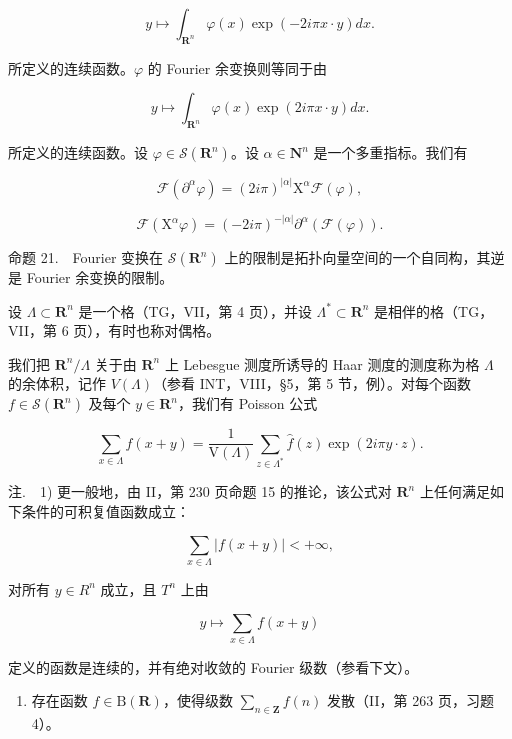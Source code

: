 \[
y \mapsto \int_ {\mathbf {R} ^ {n}} \varphi (x) \exp (- 2 i \pi x \cdot y) d x.
\]

所定义的连续函数。\(\varphi\) 的 Fourier 余变换则等同于由

\[
y \mapsto \int_ {\mathbf {R} ^ {n}} \varphi (x) \exp (2 i \pi x \cdot y) d x.
\]

所定义的连续函数。设 \(\varphi\in\mathcal{S}(\mathbf{R}^{n})\)。设 \(\alpha\in\mathbf{N}^{n}\) 是一个多重指标。我们有

\[
\mathcal {F} (\partial^ {\alpha} \varphi) = (2 i \pi) ^ {| \alpha |} \mathrm{X} ^ {\alpha} \mathcal {F} (\varphi),
\]

\[
\mathcal {F} (\mathrm{X} ^ {\alpha} \varphi) = (- 2 i \pi) ^ {- | \alpha |} \partial^ {\alpha} (\mathcal {F} (\varphi)).
\]

命题 21.　Fourier 变换在 \(\mathcal{S}(\mathbf{R}^{n})\) 上的限制是拓扑向量空间的一个自同构，其逆是 Fourier 余变换的限制。

设 \(\Lambda \subset \mathbf{R}^n\) 是一个格（TG，VII，第 4 页），并设 \(\Lambda^{*} \subset \mathbf{R}^{n}\) 是相伴的格（TG，VII，第 6 页），有时也称对偶格。

我们把 \(\mathbf{R}^n/\Lambda\) 关于由 \(\mathbf{R}^n\) 上 Lebesgue 测度所诱导的 Haar 测度的测度称为格 \(\Lambda\) 的余体积，记作 \(V(\Lambda)\)（参看 INT，VIII，§5，第 5 节，例）。对每个函数 \(f \in \mathcal{S}(\mathbf{R}^n)\) 及每个 \(y \in \mathbf{R}^n\)，我们有 Poisson 公式

\[
\sum_ {x \in \Lambda} f (x + y) = \frac {1}{\mathrm{V} (\Lambda)} \sum_ {z \in \Lambda^ {*}} \widehat {f} (z) \exp (2 i \pi y \cdot z).
\]

注.　1) 更一般地，由 II，第 230 页命题 15 的推论，该公式对 \(\mathbf{R}^n\) 上任何满足如下条件的可积复值函数成立：

\[
\sum_ {x \in \Lambda} | f (x + y) | <   + \infty ,
\]

对所有 \(y \in R^{n}\) 成立，且 \(T^{n}\) 上由

\[
y \mapsto \sum_ {x \in \Lambda} f (x + y)
\]

定义的函数是连续的，并有绝对收敛的 Fourier 级数（参看下文）。

\begin{enumerate}
\def\labelenumi{\arabic{enumi})}
\setcounter{enumi}{1}
\tightlist
\item
  存在函数 \(f \in \mathrm{B}(\mathbf{R})\)，使得级数 \(\sum_{n \in \mathbf{Z}} f(n)\) 发散（II，第 263 页，习题 4）。
\end{enumerate}

